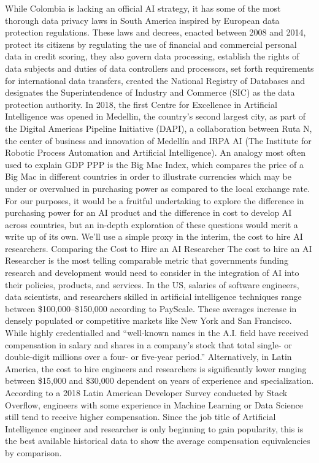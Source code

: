 \documentclass[conference]{IEEEtran}
\begin{document}
While Colombia is lacking an official AI strategy, it has some of the most thorough data privacy laws in South America inspired by European data protection regulations. These laws and decrees, enacted between 2008 and 2014, protect its citizens by regulating the use of financial and commercial personal data in credit scoring, they also govern data processing, establish the rights of data subjects and duties of data controllers and processors, set forth requirements for international data transfers, created the National Registry of Databases and designates the Superintendence of Industry and Commerce (SIC) as the data protection authority. In 2018, the first Centre for Excellence in Artificial Intelligence was opened in Medellin, the country's second largest city, as part of the Digital Americas Pipeline Initiative (DAPI), a collaboration between Ruta N, the center of business and innovation of Medellín and IRPA AI (The Institute for Robotic Process Automation and Artificial Intelligence).
An analogy most often used to explain GDP PPP is the Big Mac Index, which compares the price of a Big Mac in different countries in order to illustrate currencies which may be under or overvalued in purchasing power as compared to the local exchange rate. For our purposes, it would be a fruitful undertaking to explore the difference in purchasing power for an AI product and the difference in cost to develop AI across countries, but an in-depth exploration of these questions would merit a write up of its own. We'll use a simple proxy in the interim, the cost to hire AI researchers.
Comparing the Cost to Hire an AI Researcher
The cost to hire an AI Researcher is the most telling comparable metric that governments funding research and development would need to consider in the integration of AI into their policies, products, and services. In the US, salaries of software engineers, data scientists, and researchers skilled in artificial intelligence techniques range between \$100,000–\$150,000 according to PayScale. These averages increase in densely populated or competitive markets like New York and San Francisco. While highly credentialled and ``well-known names in the A.I. field have received compensation in salary and shares in a company's stock that total single- or double-digit millions over a four- or five-year period.''
Alternatively, in Latin America, the cost to hire engineers and researchers is significantly lower ranging between \$15,000 and \$30,000 dependent on years of experience and specialization. According to a 2018 Latin American Developer Survey conducted by Stack Overflow, engineers with some experience in Machine Learning or Data Science still tend to receive higher compensation. Since the job title of Artificial Intelligence engineer and researcher is only beginning to gain popularity, this is the best available historical data to show the average compensation equivalencies by comparison.
\end{document}
